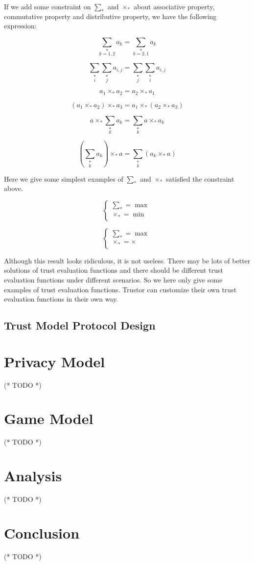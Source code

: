 \documentclass{article}
\begin{document}
If we add some constraint on \(\sum _*\) and \(\times _*\) about associative property, commutative property and distributive property, we have the
following expression:

\[\underset{k=1,2}{\sum _*}a_k=\underset{k=2,1}{\sum _*}a_k\]

\[\underset{i}{\sum _*}\underset{j}{\sum _*}a_{i,j}=\underset{j}{\sum _*}\underset{i}{\sum _*}a_{i,j}\]

\[a_1\times _*a_2=a_2\times _*a_1\]

\[\left(a_1\times _*a_2\right)\times _*a_3=a_1\times _*\left(a_2\times _*a_3\right)\]

\[a\times _*\underset{k}{\sum _*}a_k=\underset{k}{\sum _*}a\times _*a_k\]

\[\left(\underset{k}{\sum _*}a_k\right)\times _*a=\underset{k}{\sum _*}\left(a_k\times _*a\right)\]

Here we give some simplest examples of { }\(\sum _*\) and \(\times _*\) satisfied the constraint above.

\[\left\{
\begin{array}{c}
 \sum _*=\max  \\
 \times _*=\min  \\
\end{array}
\right.\]

\[\left\{
\begin{array}{c}
 \sum _*=\max  \\
 \times _*=\times  \\
\end{array}
\right.\]

Although this result looks ridiculous, it is not useless. There may be lots of better solutions of trust evaluation functions and there should be
different trust evaluation functions under different scenarios. So we here only give some examples of trust evaluation functions. Trustor can customize
their own trust evaluation functions in their own way.


\subsection{Trust Model Protocol Design}


\section{Privacy Model}

(* TODO *)


\section{Game Model}

(* TODO *)


\section{Analysis}

(* TODO *)


\section{Conclusion}

(* TODO *)
\end{document}
